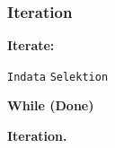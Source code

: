 \documentclass[../main.tex]{subfiles}
\begin{document}
\subsubsection{Iteration}

\begin{algorithm}[H]
\SetAlgoLined


 \textbf{Iterate:} 
 
   \texttt{Indata}\;
   \texttt{Selektion}\;
 
 \textbf{While (Done)}
 \caption{\textbf{Iteration.}}
 
\end{algorithm}
\end{document}
